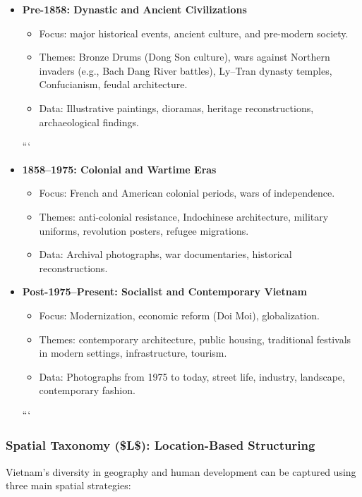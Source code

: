 \documentclass[conference]{IEEEtran}
\begin{document}
\begin{itemize}
	\item \textbf{Pre-1858: Dynastic and Ancient Civilizations}
	\begin{itemize}
		\item Focus: major historical events, ancient culture, and pre-modern society.
		\item Themes: Bronze Drums (Dong Son culture), wars against Northern invaders (e.g., Bach Dang River battles), Ly–Tran dynasty temples, Confucianism, feudal architecture.
		\item Data: Illustrative paintings, dioramas, heritage reconstructions, archaeological findings.
	\end{itemize}
	
	```
	\item \textbf{1858–1975: Colonial and Wartime Eras}
	\begin{itemize}
		\item Focus: French and American colonial periods, wars of independence.
		\item Themes: anti-colonial resistance, Indochinese architecture, military uniforms, revolution posters, refugee migrations.
		\item Data: Archival photographs, war documentaries, historical reconstructions.
	\end{itemize}
	
	\item \textbf{Post-1975–Present: Socialist and Contemporary Vietnam}
	\begin{itemize}
		\item Focus: Modernization, economic reform (Doi Moi), globalization.
		\item Themes: contemporary architecture, public housing, traditional festivals in modern settings, infrastructure, tourism.
		\item Data: Photographs from 1975 to today, street life, industry, landscape, contemporary fashion.
	\end{itemize}
	```
	
\end{itemize}

\subsubsection{Spatial Taxonomy (\$L\$): Location-Based Structuring}

Vietnam's diversity in geography and human development can be captured using three main spatial strategies:
\end{document}
